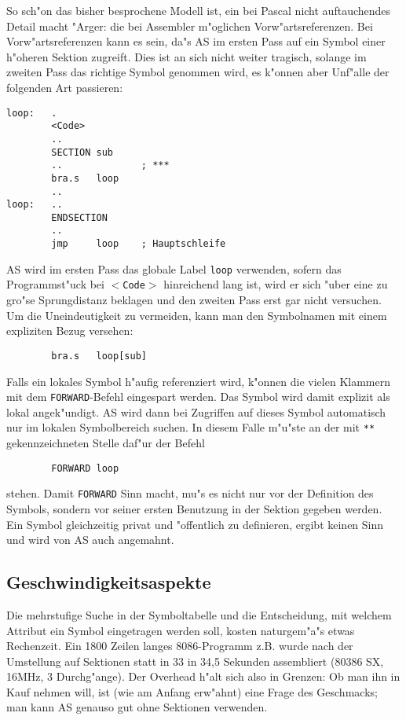 \documentclass[12pt,a4paper,twoside]{report}
\newcommand{\tty}[1]{{\tt #1}}
\begin{document}
{So sch"on das bisher besprochene Modell ist, ein bei Pascal nicht
auftauchendes Detail macht "Arger: die bei Assembler m"oglichen
Vorw"artsreferenzen.  Bei Vorw"artsreferenzen kann es sein, da"s AS
im ersten Pass auf ein Symbol einer h"oheren Sektion zugreift.  Dies
ist an sich nicht weiter tragisch, solange im zweiten Pass das richtige
Symbol genommen wird, es k"onnen aber Unf"alle der folgenden Art passieren:
\begin{verbatim}
loop:   .
        <Code>
        ..
        SECTION sub
        ..              ; ***
        bra.s   loop
        ..
loop:   ..
        ENDSECTION
        ..
        jmp     loop    ; Hauptschleife
\end{verbatim}
AS wird im ersten Pass das globale Label \tty{loop} verwenden, sofern
das Programmst"uck bei \tty{$<$Code$>$} hinreichend lang ist, wird er
sich "uber eine zu gro"se Sprungdistanz beklagen und den zweiten Pass erst
gar nicht versuchen.  Um die Uneindeutigkeit zu vermeiden, kann man den
Symbolnamen mit einem expliziten Bezug versehen:
\begin{verbatim}
        bra.s   loop[sub]
\end{verbatim}
Falls ein lokales Symbol h"aufig referenziert wird, k"onnen die vielen
Klammern mit dem \tty{FORWARD}-Befehl eingespart werden.  Das Symbol
wird damit explizit als lokal angek"undigt.  AS wird dann bei Zugriffen
auf dieses Symbol automatisch nur im lokalen Symbolbereich suchen.
In diesem Falle m"u"ste an der mit \tty{***} gekennzeichneten Stelle
daf"ur der Befehl
\begin{verbatim}
        FORWARD loop
\end{verbatim}
stehen.
Damit \tty{FORWARD} Sinn macht, mu"s es nicht nur vor der Definition des
Symbols, sondern vor seiner ersten Benutzung in der Sektion gegeben werden.
Ein Symbol gleichzeitig privat und "offentlich zu definieren, ergibt keinen
Sinn und wird von AS auch angemahnt.


\subsection{Geschwindigkeitsaspekte}

Die mehrstufige Suche in der Symboltabelle und die Entscheidung, mit welchem
Attribut ein Symbol eingetragen werden soll, kosten naturgem"a"s etwas
Rechenzeit.  Ein 1800 Zeilen langes 8086-Programm z.B. wurde nach der
Umstellung auf Sektionen statt in 33 in 34,5 Sekunden assembliert
(80386 SX, 16MHz, 3 Durchg"ange).  Der Overhead h"alt sich also in Grenzen:
Ob man ihn in Kauf nehmen will, ist (wie am Anfang erw"ahnt) eine Frage des
Geschmacks;  man kann AS genauso gut ohne Sektionen verwenden.

}
\end{document}
